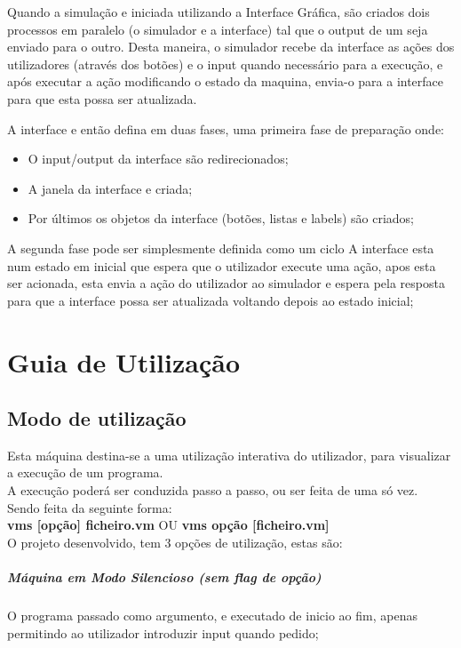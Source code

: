 \documentclass{report}
\begin{document}
Quando a simulação e iniciada utilizando a Interface Gráfica, são criados dois processos em paralelo (o simulador e a interface) tal que
o output de um seja enviado para o outro. Desta maneira, o simulador recebe da interface
as ações dos utilizadores (através dos botões) e o input quando necessário para a execução, e
após executar a ação modificando o estado da maquina,  envia-o para a interface para que esta possa ser atualizada.

A interface e então defina em duas fases, uma primeira fase de preparação onde:
\begin{itemize}
	\item O input/output da interface são redirecionados;
	\item A janela da interface e criada;
	\item Por últimos os objetos da interface (botões, listas e labels) são criados;
\end{itemize}

\quad A segunda fase pode ser simplesmente definida como um ciclo
 A interface esta num estado em inicial que espera que o utilizador execute uma ação, apos esta ser acionada,
 esta envia a ação do utilizador ao simulador e espera pela resposta para que a interface possa ser atualizada
 voltando depois ao estado inicial;

\chapter{Guia de Utilização}
\section{Modo de utilização}
\quad Esta máquina destina-se a uma utilização interativa do utilizador, para visualizar a execução de um programa.\\
A execução poderá ser conduzida passo a passo, ou ser feita de uma só vez.\\
Sendo feita da seguinte forma:\\

\quad \textbf{vms [opção] ficheiro.vm} OU \textbf{vms opção [ficheiro.vm]}\\

O projeto desenvolvido, tem 3 opções de utilização, estas são:
\paragraph{\quad Máquina em Modo Silencioso (sem flag de opção)}
	O programa passado como argumento, e executado de inicio ao fim, apenas permitindo ao utilizador introduzir input quando pedido;
\end{document}
